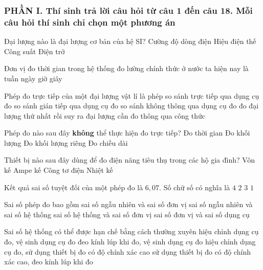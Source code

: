 \subsubsection*{PHẦN I. Thí sinh trả lời câu hỏi từ câu 1 đến câu 18. Mỗi câu hỏi thí sinh chỉ chọn một phương án}
\setcounter{ex}{0}
\begin{ex}%
Đại lượng nào là đại lượng cơ bản của hệ SI?
\choice
{\True Cường độ dòng điện}
{Hiệu điện thế}
{Công suất}
{Điện trở}
\loigiai{
}
\end{ex}
\begin{ex}%
Đơn vị đo thời gian trong hệ thống đo lường chính thức ở nước ta hiện nay là
\choice
{tuần}
{ngày}
{giờ}
{\True giây}
\loigiai{

}
\end{ex}
\begin{ex}%
Phép đo trực tiếp của một đại lượng vật lí là phép
\choice
{\True so sánh trực tiếp qua dụng cụ đo}
{so sánh gián tiếp qua dụng cụ đo}
{so sánh không thông qua dụng cụ đo}
{đo đại lượng thứ nhất rồi suy ra đại lượng cần đo thông qua công thức}
\loigiai{

}
\end{ex}
\begin{ex}%
Phép đo nào sau đây \textbf{không} thể thực hiện đo trực tiếp?
\choice
{Đo thời gian}
{Đo khối lượng}
{\True Đo khối lượng riêng}
{Đo chiều dài}
\loigiai{
}
\end{ex}
\begin{ex}%
Thiết bị nào sau đây dùng để đo điện năng tiêu thụ trong các hộ gia đình?
\choice
{Vôn kế}
{Ampe kế}
{\True Công tơ điện}
{Nhiệt kế}
\loigiai{}
\end{ex}
\begin{ex}%
Kết quả sai số tuyệt đối của một phép đo là $6,07$. Số chữ số có nghĩa là
\choice
{$4$}
{$2$}
{\True $3$}
{$1$}
\end{ex}
\begin{ex}%
Sai số phép đo bao gồm
\choice
{sai số ngẫu nhiên và sai số đơn vị}
{\True sai số ngẫu nhiên và sai số hệ thống}
{sai số hệ thống và sai số đơn vị}
{sai số đơn vị và sai số dụng cụ}
\loigiai{
}
\end{ex}
\begin{ex}%
Sai số hệ thống có thể được hạn chế bằng cách thường xuyên
\choice
{hiệu chỉnh dụng cụ đo, vệ sinh dụng cụ đo}
{đeo kính lúp khi đo, vệ sinh dụng cụ đo}
{\True hiệu chỉnh dụng cụ đo, sử dụng thiết bị đo có độ chính xác cao}
{sử dụng thiết bị đo có độ chính xác cao, đeo kính lúp khi đo}
\loigiai{
}
\end{ex}
